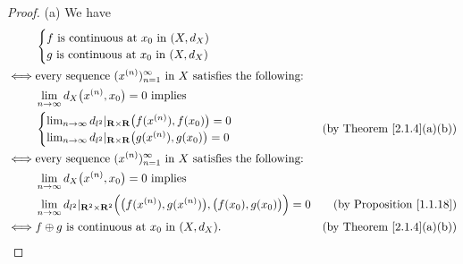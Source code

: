 \begin{proof}{(a)}
    We have
    \begin{align*}
             & \begin{cases}
            f \text{ is continuous at } x_0 \text{ in } (X, d_X) \\
            g \text{ is continuous at } x_0 \text{ in } (X, d_X)
        \end{cases}                                                                                                                                                       \\
        \iff & \text{every sequence } (x^{(n)})_{n = 1}^\infty \text{ in } X \text{ satisfies the following:}                                                                                  \\
             & \lim_{n \to \infty} d_X\big(x^{(n)}, x_0\big) = 0 \text{ implies }                                                                                                              \\
             & \begin{cases}
            \lim_{n \to \infty} d_{l^2}|_{\mathbf{R} \times \mathbf{R}}\big(f(x^{(n)}), f(x_0)\big) = 0 \\
            \lim_{n \to \infty} d_{l^2}|_{\mathbf{R} \times \mathbf{R}}\big(g(x^{(n)}), g(x_0)\big) = 0
        \end{cases}                                                                                                               & \text{(by Theorem \ref{2.1.4}(a)(b))} \\
        \iff & \text{every sequence } (x^{(n)})_{n = 1}^\infty \text{ in } X \text{ satisfies the following:}                                                                                  \\
             & \lim_{n \to \infty} d_X\big(x^{(n)}, x_0\big) = 0 \text{ implies }                                                                                                              \\
             & \lim_{n \to \infty} d_{l^2}|_{\mathbf{R}^2 \times \mathbf{R}^2}\Big(\big(f(x^{(n)}), g(x^{(n)})\big), \big(f(x_0), g(x_0)\big)\Big) = 0 & \text{(by Proposition \ref{1.1.18})}  \\
        \iff & f \oplus g \text{ is continuous at } x_0 \text{ in } (X, d_X).                                                                          & \text{(by Theorem \ref{2.1.4}(a)(b))}
    \end{align*}
\end{proof}

